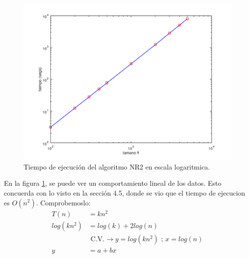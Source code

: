 \begin{figure}[h!]
    \includegraphics[width=\linewidth]{Grafica_5_3_2.png}
    \caption{Tiempo de ejecución del algoritmo NR2 en escala logaritmica.}
    \label{fig:Grafica_5_3_2}
\end{figure}
En la figura \ref{fig:Grafica_5_3_2}, se puede ver un comportamiento lineal de los datos.
Esto concuerda con lo visto en la sección 4.5, donde se vio que el tiempo de ejecucion es $O(n^2)$.
Comprobemoslo:
\begin{align}
    T(n) &= kn^2 \\
    log(kn^2) &= log(k) + 2log(n) \\
    &\text{ C.V.} \rightarrow y = log(kn^2) \text{ ; } x = log(n) \\
    y &= a + bx
\end{align}

